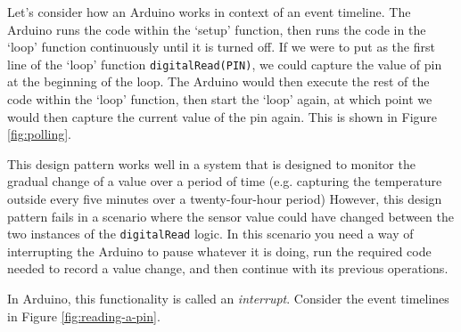 \documentclass[11pt,a4paper]{article}
\begin{document}
Let's consider how an Arduino works in context of an event timeline. The Arduino runs the code within the `setup' function, then runs the code in the `loop' function continuously until it is turned off. If we were to put as the first line of the `loop' function \verb|digitalRead(PIN)|, we could capture the value of pin at the beginning of the loop. The Arduino would then execute the rest of the code within the `loop' function, then start the `loop' again, at which point we would then capture the current value of the pin again. This is shown in Figure \ref{fig:polling}.

This design pattern works well in a system that is designed to monitor the gradual change of a value over a period of time (e.g. capturing the temperature outside every five minutes over a twenty-four-hour period) However, this design pattern fails in a scenario where the sensor value could have changed between the two instances of the \verb|digitalRead| logic. In this scenario you need a way of interrupting the Arduino to pause whatever it is doing, run the required code needed to record a value change, and then continue with its previous operations.

In Arduino, this functionality is called an \textit{interrupt}. Consider the event timelines in Figure \ref{fig:reading-a-pin}.
\end{document}
